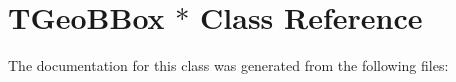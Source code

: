 \hypertarget{class_t_geo_b_box_01_5}{}\section{T\+Geo\+B\+Box $\ast$ Class Reference}
\label{class_t_geo_b_box_01_5}


The documentation for this class was generated from the following files\+: